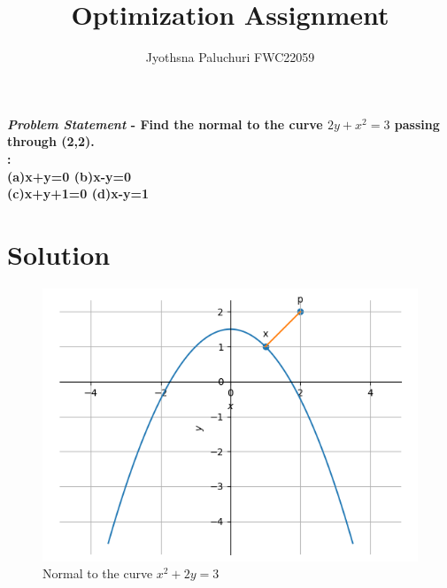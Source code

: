 \documentclass[journal,10pt,twocolumn]{article}
\title{\textbf{Optimization Assignment}}
\author{Jyothsna Paluchuri \hspace{9cm} FWC22059}
\begin{document}
\maketitle
\paragraph{\textit{Problem Statement} -
\fi
Find the normal to the curve $2y+x^2=3$ passing through (2,2). 
\\
\solution 
\iffalse
:\\
(a)x+y=0  \hspace{2cm} (b)x-y=0\\ 
(c)x+y+1=0 \hspace{2cm}  (d)x-y=1\\}
\section*{\large Solution}

\begin{figure}[H]
\centering
\includegraphics[width=1\columnwidth]{opt.png}
\caption{Normal to the curve $x^2+2y=3$}
\end{figure}
\end{document}
